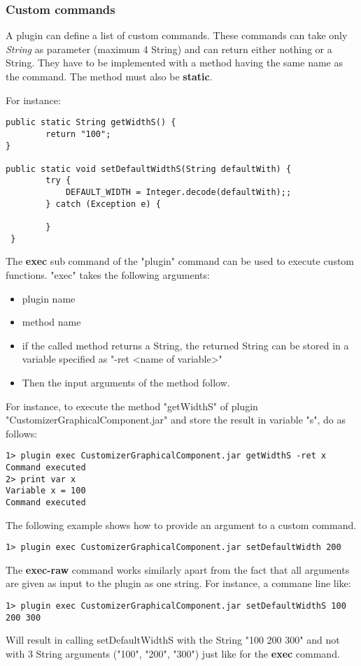 \documentclass[12pt]{article}
\begin{document}
\subsubsection{Custom commands}
A plugin can define a list of custom commands. These commands can take only \textit{String} as parameter (maximum 4 String) and can return either nothing or a String. They have to be implemented with a method having the same name as the command. The method must also be \textbf{static}.

For instance:
\begin{verbatim}
public static String getWidthS() {
        return "100";
}

public static void setDefaultWidthS(String defaultWith) {
        try {
            DEFAULT_WIDTH = Integer.decode(defaultWith);;
        } catch (Exception e) {

        }
 }

\end{verbatim}

The \textbf{exec} sub command of the "plugin" command can be used to execute custom functions. "exec" takes the following arguments:
\begin{itemize}
\item plugin name
\item method name
\item if the called method returns a String, the returned String can be stored in a variable specified as "-ret <name of variable>"
\item Then the input arguments of the method follow. 
\end{itemize}

For instance, to execute the method "getWidthS" of plugin "CustomizerGraphicalComponent.jar" and store the result in variable "s", do as follows:
\begin{verbatim}
1> plugin exec CustomizerGraphicalComponent.jar getWidthS -ret x
Command executed
2> print var x
Variable x = 100
Command executed
\end{verbatim}

The following example shows how to provide an argument to a custom command.
\begin{verbatim}
1> plugin exec CustomizerGraphicalComponent.jar setDefaultWidth 200
\end{verbatim}

The \textbf{exec-raw} command works similarly apart from the fact that all arguments are given as input to the plugin as one string. For instance, a commane line like:
\begin{verbatim}
1> plugin exec CustomizerGraphicalComponent.jar setDefaultWidthS 100 200 300
\end{verbatim}
Will result in calling setDefaultWidthS with the String "100 200 300" and not with 3 String arguments ("100", "200", "300") just like for the \textbf{exec} command.  
\end{document}
